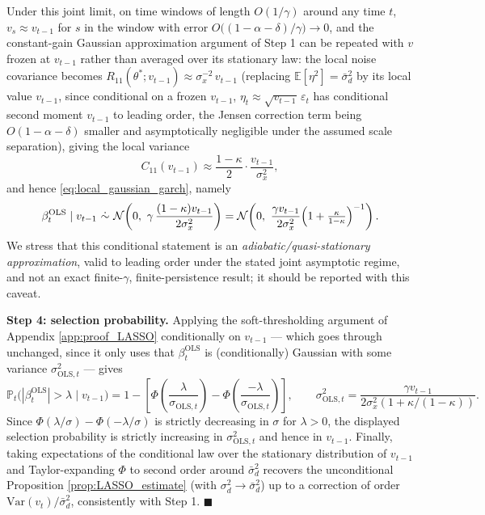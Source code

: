 Under this joint limit, on time windows of length $O(1/\gamma)$ around any time $t$, $v_{s}\approx
v_{t-1}$ for $s$ in the window with error $O\bigl((1-\alpha-\delta)/\gamma\bigr)\to 0$, and the
constant-gain Gaussian approximation argument of Step 1 can be repeated with $v$ frozen at $v_{t-1}$
rather than averaged over its stationary law: the local noise covariance becomes
$R_{11}(\theta^*;v_{t-1}) \approx \sigma_x^{-2}\, v_{t-1}$ (replacing $\mathbb E[\eta^2]=\bar\sigma_d^2$
by its local value $v_{t-1}$, since conditional on a frozen $v_{t-1}$, $\eta_t\approx
\sqrt{v_{t-1}}\,\varepsilon_t$ has conditional second moment $v_{t-1}$ to leading order, the Jensen
correction term being $O(1-\alpha-\delta)$ smaller and asymptotically negligible under the assumed scale
separation), giving the local variance
\[
C_{11}(v_{t-1}) \approx \frac{1-\kappa}{2}\cdot\frac{v_{t-1}}{\sigma_x^2},
\]
and hence \eqref{eq:local_gaussian_garch}, namely
\[
\beta_t^{\mathrm{OLS}}\mid v_{t-1}\ \dot\sim\ \mathcal N\!\left(0,\ \gamma\,\frac{(1-\kappa)v_{t-1}}{2\sigma_x^2}\right)
= \mathcal N\!\left(0,\ \frac{\gamma v_{t-1}}{2\sigma_x^2}\Bigl(1+\tfrac{\kappa}{1-\kappa}\Bigr)^{-1}\right).
\]
We stress that this conditional statement is an \emph{adiabatic/quasi-stationary approximation}, valid
to leading order under the stated joint asymptotic regime, and not an exact finite-$\gamma$,
finite-persistence result; it should be reported with this caveat.

\textbf{Step 4: selection probability.} Applying the soft-thresholding argument of Appendix
\ref{app:proof_LASSO} conditionally on $v_{t-1}$ --- which goes through unchanged, since it only uses
that $\beta_t^{\mathrm{OLS}}$ is (conditionally) Gaussian with some variance $\sigma_{\mathrm{OLS},t}^2$
--- gives
\[
\mathbb P_t\bigl(|\beta_t^{\mathrm{OLS}}|>\lambda \mid v_{t-1}\bigr)
= 1-\left[\Phi\!\left(\frac{\lambda}{\sigma_{\mathrm{OLS},t}}\right)-\Phi\!\left(\frac{-\lambda}{\sigma_{\mathrm{OLS},t}}\right)\right],
\qquad \sigma_{\mathrm{OLS},t}^2=\frac{\gamma v_{t-1}}{2\sigma_x^2(1+\kappa/(1-\kappa))}.
\]
Since $\Phi(\lambda/\sigma)-\Phi(-\lambda/\sigma)$ is strictly decreasing in $\sigma$ for $\lambda>0$,
the displayed selection probability is strictly increasing in $\sigma_{\mathrm{OLS},t}^2$ and hence in
$v_{t-1}$. Finally, taking expectations of the conditional law over the stationary distribution of
$v_{t-1}$ and Taylor-expanding $\Phi$ to second order around $\bar\sigma_d^2$ recovers the unconditional
Proposition \ref{prop:LASSO_estimate} (with $\sigma_d^2\to\bar\sigma_d^2$) up to a correction of order
$\mathrm{Var}(v_t)/\bar\sigma_d^2$, consistently with Step 1. $\blacksquare$


